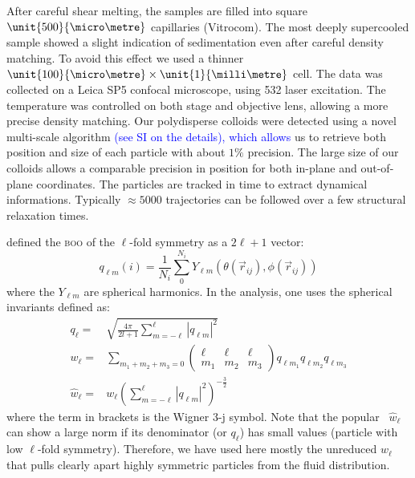 After careful shear melting, the samples are filled into square $\unit{500}{\micro\metre}$ capillaries (Vitrocom). The most deeply supercooled sample showed a slight indication of sedimentation even after careful density matching. To avoid this effect we used a thinner $\unit{100}{\micro\metre}\times\unit{1}{\milli\metre}$ cell. The data was collected on a Leica SP5 confocal microscope, using \unit{532}{\nano\meter} laser excitation. The temperature was controlled on both stage and objective lens, allowing a more precise density matching. Our polydisperse colloids were detected using a novel multi-scale algorithm \textcolor{blue}{(see SI on the details), which allows} us to retrieve both position and size of each particle with about $1\%$ precision. The large size of our colloids allows a comparable precision in position for both in-plane and out-of-plane coordinates. The particles are tracked in time to extract dynamical informations. Typically $\approx 5000$ trajectories can be followed over a few structural relaxation times.



\citet{steinhardt1983boo} defined the \textsc{boo} of the $\ell$-fold symmetry as a $2\ell+1$ vector:
\begin{equation}
	q_{\ell m}(i) = \frac{1}{N_i}\sum_{0}^{N_i} Y_{\ell m}(\theta(\vec r_{ij}),\phi(\vec r_{ij}))
	\label{eq:qlm}
\end{equation}
where the $Y_{\ell m}$ are spherical harmonics. In the analysis, one uses the spherical invariants defined as:
\begin{align}
	q_\ell =& \sqrt{\frac{4\pi}{2l+1} \sum_{m=-\ell}^{\ell} |q_{\ell m}|^2 }\label{eq:ql}\\
	w_\ell =& \sum_{m_1+m_2+m_3=0} 
			\left( \begin{array}{ccc}
				\ell & \ell & \ell \\
				m_1 & m_2 & m_3 
			\end{array} \right)
			q_{\ell m_1} q_{\ell m_2} q_{\ell m_3} \label{eq:wl}\\
	\hat{w}_\ell =& w_\ell{\left( \sum_{m=-\ell}^{\ell} |q_{\ell m}|^2 \right)}^{-\frac{3}{2}}
\end{align}
where the term in brackets is the Wigner 3-j symbol. Note that the popular~\citep{steinhardt1983boo,Lechner2008} $\hat{w}_\ell$ can show a large norm if its denominator (or $q_\ell$) has small values (particle with low $\ell$-fold symmetry). Therefore, we have used here mostly the unreduced $w_\ell$ that pulls clearly apart highly symmetric particles from the fluid distribution.

